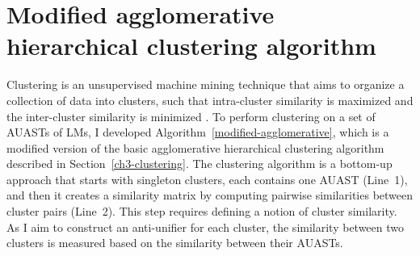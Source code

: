 \section{Modified agglomerative hierarchical clustering algorithm} \label{m-clustering-alg}
Clustering is an unsupervised machine mining technique that aims to organize a collection of data into clusters, such that intra-cluster similarity is maximized and the inter-cluster similarity is minimized \cite{karypis1999chameleon,grira2004unsupervised}. 
To perform clustering on a set of AUASTs of LMs, I developed Algorithm~\ref{modified-agglomerative}, which is a modified version of the basic agglomerative hierarchical clustering algorithm described in Section~\ref{ch3-clustering}. The clustering algorithm is a bottom-up approach that starts with singleton clusters, each contains one AUAST (Line~1), and then it creates a similarity matrix by computing pairwise similarities between cluster pairs (Line~2). This step requires defining a notion of cluster similarity. As I aim to construct an anti-unifier for each cluster, the similarity between two clusters is measured based on the similarity between their AUASTs.



